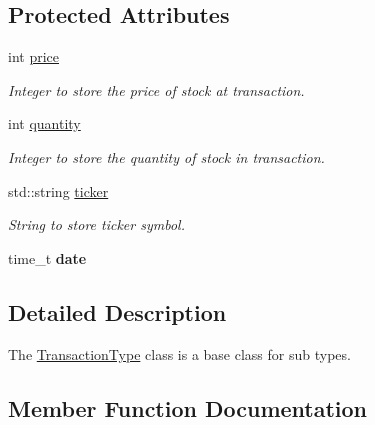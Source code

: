 \subsection*{Protected Attributes}
\begin{DoxyCompactItemize}
\item 
\mbox{\label{class_transaction_type_a079b40eebde548904529841f8746d4ff}} 
int \mbox{\hyperlink{class_transaction_type_a079b40eebde548904529841f8746d4ff}{price}}
\begin{DoxyCompactList}\small\item\em Integer to store the price of stock at transaction. \end{DoxyCompactList}\item 
\mbox{\label{class_transaction_type_a60b6221cf4b0bf30f5c4a4e15893b98d}} 
int \mbox{\hyperlink{class_transaction_type_a60b6221cf4b0bf30f5c4a4e15893b98d}{quantity}}
\begin{DoxyCompactList}\small\item\em Integer to store the quantity of stock in transaction. \end{DoxyCompactList}\item 
\mbox{\label{class_transaction_type_aad758d557417a18c944dc9849a390391}} 
std\+::string \mbox{\hyperlink{class_transaction_type_aad758d557417a18c944dc9849a390391}{ticker}}
\begin{DoxyCompactList}\small\item\em String to store ticker symbol. \end{DoxyCompactList}\item 
\mbox{\label{class_transaction_type_afb98c9a6a95e2fd8157448edb9eeecce}} 
time\+\_\+t {\bfseries date}
\end{DoxyCompactItemize}


\subsection{Detailed Description}
The \mbox{\hyperlink{class_transaction_type}{Transaction\+Type}} class is a base class for sub types. 

\subsection{Member Function Documentation}
\mbox{\label{class_transaction_type_ae93afca932014b0dfa4d1a3a66ca0ad2}} 
